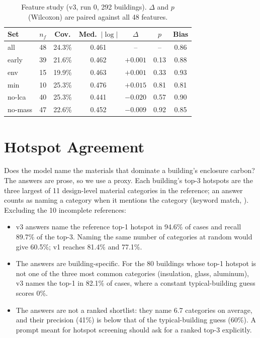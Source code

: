 \documentclass[10pt,letterpaper]{article}
\begin{document}
\begin{table}[t]
\centering\footnotesize
\caption{Feature study (v3, run 0, 292 buildings). $\Delta$ and $p$ (Wilcoxon) are paired against all 48 features.}
\label{tab:features}
\setlength{\tabcolsep}{4pt}
\begin{tabular}{lcccccc}
\toprule
Set & $n_f$ & Cov. & Med.\ $|\log|$ & $\Delta$ & $p$ & Bias \\
\midrule
all & 48 & 24.3\% & 0.461 & -- & -- & 0.86 \\
early & 39 & 21.6\% & 0.462 & $+0.001$ & 0.13 & 0.88 \\
env & 15 & 19.9\% & 0.463 & $+0.001$ & 0.33 & 0.93 \\
min & 10 & 25.3\% & 0.476 & $+0.015$ & 0.81 & 0.81 \\
no-lca & 40 & 25.3\% & 0.441 & $-0.020$ & 0.57 & 0.90 \\
no-mass & 47 & 22.6\% & 0.452 & $-0.009$ & 0.92 & 0.85 \\
\bottomrule
\end{tabular}
\end{table}

\section{Hotspot Agreement}
\label{sec:hotspot}
Does the model name the materials that dominate a building's enclosure carbon? The answers are prose, so we use a proxy. Each building's top-3 hotspots are the three largest of 11 design-level material categories in the reference; an answer counts as naming a category when it mentions the category (keyword match, ). Excluding the 10 incomplete references:
\begin{itemize}
\item v3 answers name the reference top-1 hotspot in 94.6\% of cases and recall 89.7\% of the top-3. Naming the same number of categories at random would give 60.5\%; v1 reaches 81.4\% and 77.1\%.
\item The answers are building-specific. For the 80 buildings whose top-1 hotspot is not one of the three most common categories (insulation, glass, aluminum), v3 names the top-1 in 82.1\% of cases, where a constant typical-building guess scores 0\%.
\item The answers are not a ranked shortlist: they name 6.7 categories on average, and their precision (41\%) is below that of the typical-building guess (60\%). A prompt meant for hotspot screening should ask for a ranked top-3 explicitly.
\end{itemize}
\end{document}
